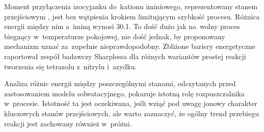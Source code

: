 Moment przyłączenia izocyjanku do~kationu iminiowego, reprezentowany stanem przejściowym
  , jest bez wątpienia krokiem limitującym szybkość procesu.
Różnica energii między nim a~iminą  wynosi \SI{30.1}{\kcalpm}.
To dość dużo jak na~wolny proces biegnący w~temperaturze pokojowej, nie dość jednak,
  by proponowany mechanizm uznać za~zupełnie nieprawdopodobny.
Zbliżone bariery energetyczne raportował zespół badawczy Sharplessa dla różnych wariantów
  prostej reakcji tworzenia się tetrazolu z~nitrylu i~azydku.

Analiza różnic energii między poszczególnymi stanami, odczytanych przed zastosowaniem modelu
  solwatacyjnego, pokazuje istotną rolę rozpuszczalnika w~procesie.
Istotność ta jest oczekiwana, jeśli wziąć pod uwagę jonowy charakter kluczowych stanów przejściowych,
  ale warto zaznaczyć, że ogólny trend przebiegu reakcji jest zachowany również w~próżni.
